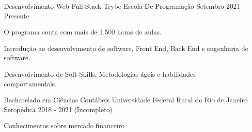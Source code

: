 

\begin{cventries}

\cventry
    {Desenvolvimento Web Full Stack} %
    {Trybe} %
    {Escola De Programação} %
    {Setembro 2021 - Presente} %
    {
      \begin{cvitems} %
        \item {O programa conta com mais de 1.500 horas de aulas.}
      \item {Introdução ao desenvolvimento de software, Front End, Back End e engenharia de software.}
      \item {Desenvolvimento de Soft Skills, Metodologias ágeis e habilidades comportamentais.}
      \end{cvitems}
    }
   
   \cventry
    {Bacharelado em Ciências Contábeis} %
    {Universidade Federal Rural do Rio de Janeiro} %
    {Seropédica} %
    {2018 - 2021 (Incompleto)} %
    {
      \begin{cvitems} %
        \item{Conhecimentos sobre mercado financeiro}
      \end{cvitems}
    } 

\end{cventries}
